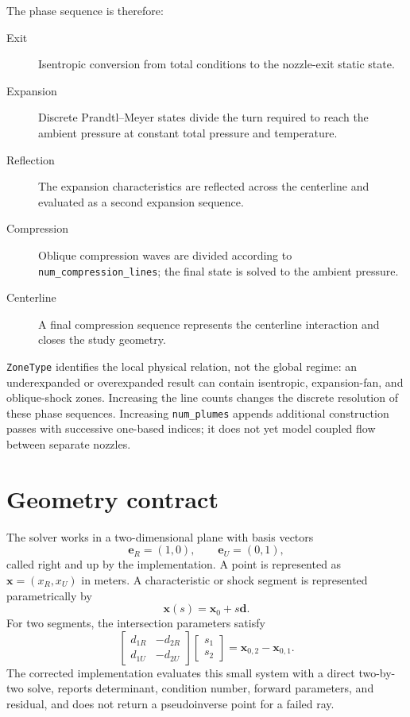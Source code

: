 \documentclass[11pt]{article}
\begin{document}
The phase sequence is therefore:

\begin{description}
  \item[Exit] Isentropic conversion from total conditions to the nozzle-exit
    static state.
  \item[Expansion] Discrete Prandtl--Meyer states divide the turn required to
    reach the ambient pressure at constant total pressure and temperature.
  \item[Reflection] The expansion characteristics are reflected across the
    centerline and evaluated as a second expansion sequence.
  \item[Compression] Oblique compression waves are divided according to
    \texttt{num\_compression\_lines}; the final state is solved to the ambient
    pressure.
  \item[Centerline] A final compression sequence represents the centerline
    interaction and closes the study geometry.
\end{description}

\texttt{ZoneType} identifies the local physical relation, not the global
regime: an underexpanded or overexpanded result can contain isentropic,
expansion-fan, and oblique-shock zones.  Increasing the line counts changes
the discrete resolution of these phase sequences.  Increasing
\texttt{num\_plumes} appends additional construction passes with successive
one-based indices; it does not yet model coupled flow between separate
nozzles.

\section{Geometry contract}

The solver works in a two-dimensional plane with basis vectors
\[
  \mathbf{e}_{R}=(1,0), \qquad \mathbf{e}_{U}=(0,1),
\]
called right and up by the implementation.  A point is represented as
\(\mathbf{x}=(x_R,x_U)\) in meters.  A characteristic or shock segment is
represented parametrically by
\begin{equation}
  \mathbf{x}(s)=\mathbf{x}_0+s\mathbf{d}.
\end{equation}
For two segments, the intersection parameters satisfy
\begin{equation}
  \begin{bmatrix}d_{1R} & -d_{2R}\\ d_{1U} & -d_{2U}\end{bmatrix}
  \begin{bmatrix}s_1\\s_2\end{bmatrix}
  = \mathbf{x}_{0,2}-\mathbf{x}_{0,1}.
\end{equation}
The corrected implementation evaluates this small system with a direct
two-by-two solve, reports determinant, condition number, forward parameters,
and residual, and does not return a pseudoinverse point for a failed ray.
\end{document}
